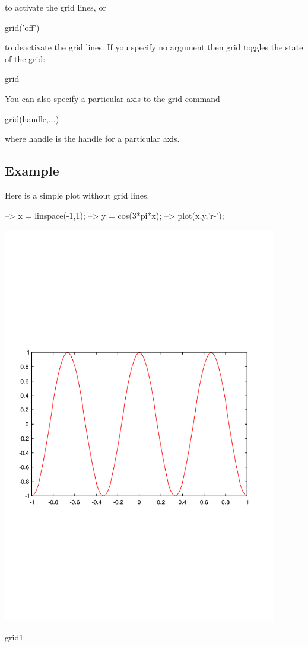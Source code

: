  to activate the grid lines, or \begin{DoxyVerb}   grid('off')
\end{DoxyVerb}
 to deactivate the grid lines. If you specify no argument then {\ttfamily grid} toggles the state of the grid\-: \begin{DoxyVerb}   grid
\end{DoxyVerb}
 You can also specify a particular axis to the grid command \begin{DoxyVerb}   grid(handle,...)
\end{DoxyVerb}
 where {\ttfamily handle} is the handle for a particular axis. \hypertarget{variables_struct_Example}{}\subsection{Example}\label{variables_struct_Example}
Here is a simple plot without grid lines.


\begin{DoxyVerbInclude}
--> x = linspace(-1,1);
--> y = cos(3*pi*x);
--> plot(x,y,'r-');
\end{DoxyVerbInclude}


 
\begin{DoxyImage}
\includegraphics[width=12cm]{grid1}
\caption{grid1}
\end{DoxyImage}


